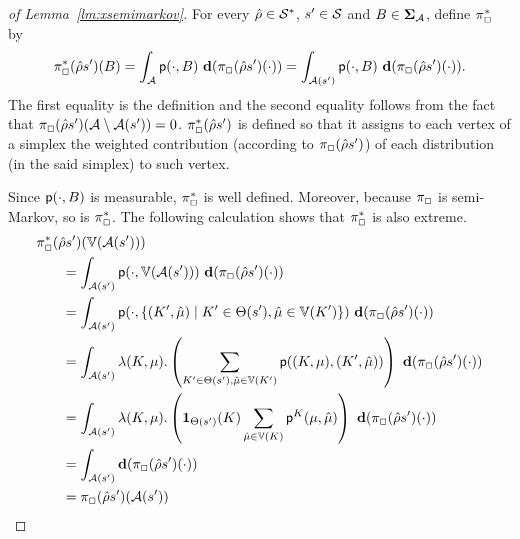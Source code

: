\begin{proof}[of Lemma~\ref{lm:xsemimarkov}]
  For every $\hat{\rho}\in\mathcal{S}^*$, $s'\in\mathcal{S}$ and
  $B\in\bm{\Sigma}_{\mathcal{A}}$, define $\pi^*_{\Box}$ by
  \[\starredstrat_\maxplay(\hat{\rho}s')(B) =
  \int_{\sgactions} \convp(\cdot,B)\ \diff(\strat_\maxplay(\hat{\rho}s')(\cdot)) =
  \int_{\enabled(s')} \convp(\cdot,B)\ \diff(\strat_\maxplay(\hat{\rho}s')(\cdot)).\]
  The first equality is the definition and the second equality follows
  from the fact that
  $\pi_{\Box}(\hat{\rho}s')(\mathcal{A}\setminus\mathcal{A}(s'))=0$.
  $\pi^*_{\Box}(\hat{\rho}s')$ is defined so that it assigns
  to each vertex of a simplex the weighted contribution (according to
  $\pi_{\Box}(\hat{\rho}s')$) of each distribution (in the said
  simplex) to such vertex.

  Since $\mathsf{p}(\cdot,B)$ is measurable, $\pi^*_{\Box}$ is
  well defined. Moreover, because $\pi_{\Box}$ is semi-Markov, so
  is $\pi^*_{\Box}$.
  The following calculation shows that $\pi^*_{\Box}$ is
  also extreme.
  \begin{align}
    \starredstrat_\maxplay(\hat{\rho}s')(\vertices(\sgactions(s')))
    \hspace{-6em}&\notag\\
    & =
    \int_{\enabled(s')} \convp(\cdot,\vertices(\sgactions(s')))\ \diff(\strat_\maxplay(\hat{\rho}s')(\cdot))
    \label{eq:xsemimarkov:starredstrat:is:x:proof:i} \\
    & =
    \int_{\enabled(s')} \convp(\cdot,\{(K',\hat{\mu})\mid K'\in\psgtrans(s'), \hat{\mu}\in\vertices(K')\})\ \diff(\strat_\maxplay(\hat{\rho}s')(\cdot))
    \label{eq:xsemimarkov:starredstrat:is:x:proof:ii} \\
    & =
    \int_{\enabled(s')} \lambda(K,\mu).\left(\sum_{K'\in\psgtrans(s'), \hat{\mu}\in\vertices(K')}\convp((K,\mu),(K',\hat{\mu}))\right)\ \diff(\strat_\maxplay(\hat{\rho}s')(\cdot))
    \label{eq:xsemimarkov:starredstrat:is:x:proof:iii} \\
    & =
    \int_{\enabled(s')} \lambda(K,\mu).\left(\charac_{\psgtrans(s')}(K)\sum_{\hat{\mu}\in\vertices(K)}\convp^K(\mu,\hat{\mu})\right)\ \diff(\strat_\maxplay(\hat{\rho}s')(\cdot))
    \label{eq:xsemimarkov:starredstrat:is:x:proof:iv} \\
    & =
    \int_{\enabled(s')} \diff(\strat_\maxplay(\hat{\rho}s')(\cdot))
    \label{eq:xsemimarkov:starredstrat:is:x:proof:v} \\
    & =
    \strat_\maxplay(\hat{\rho}s')(\enabled(s'))
    \label{eq:xsemimarkov:starredstrat:is:x:proof:vi} \\

\end{align}
\end{proof}
